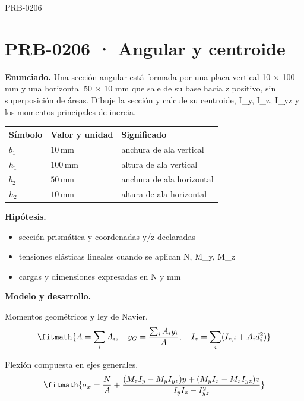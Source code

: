 \begin{studiumworked}{PRB-0206}

\section{PRB-0206 · Angular y centroide}

\textbf{Enunciado.} Una sección angular está formada por una placa vertical 10 \ensuremath{\times} 100 mm y una horizontal 50 \ensuremath{\times} 10 mm que sale de su base hacia z positivo, sin superposición de áreas. Dibuje la sección y calcule su centroide, I\_y, I\_z, I\_yz y los momentos principales de inercia.

\par\medskip\noindent\begin{tabular}{@{}p{.18\linewidth}p{.26\linewidth}p{.48\linewidth}@{}}
\toprule Símbolo & Valor y unidad & Significado\\\midrule
$b_{1}$ & $10\,\mathrm{mm}$ & anchura de ala vertical\\
$h_{1}$ & $100\,\mathrm{mm}$ & altura de ala vertical\\
$b_{2}$ & $50\,\mathrm{mm}$ & anchura de ala horizontal\\
$h_{2}$ & $10\,\mathrm{mm}$ & altura de ala horizontal\\
\bottomrule\end{tabular}\par\medskip

\textbf{Hipótesis.}\begin{itemize}\item sección prismática y coordenadas y/z declaradas
\item tensiones elásticas lineales cuando se aplican N, M\_y, M\_z
\item cargas y dimensiones expresadas en N y mm\end{itemize}

\textbf{Modelo y desarrollo.}

Momentos geométricos y ley de Navier.\[\fitmath{A = \sum_i A_i,\quad y_G = \frac{\sum_i A_i y_i}{A},\quad I_z = \sum_i (I_{z,i}+A_i d_i^2)}\]

Flexión compuesta en ejes generales.\[\fitmath{\sigma_x = \frac{N}{A}+\frac{(M_z I_y-M_y I_{yz})y+(M_y I_z-M_z I_{yz})z}{I_y I_z-I_{yz}^{2}}}\]


\end{studiumworked}
